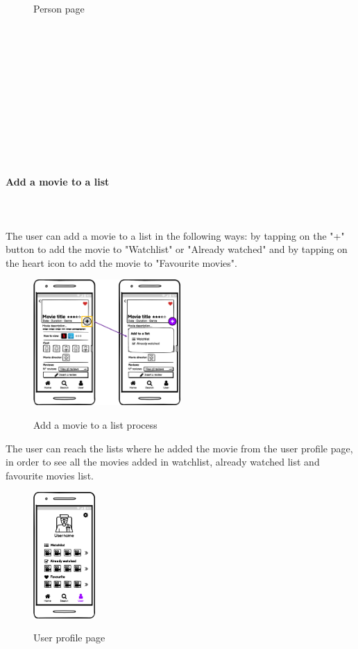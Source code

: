 \documentclass[12pt, a4paper]{article}
\numberwithin{figure}{section}
\begin{document}
\begin{center}
\begin{minipage}{0.4\textwidth}
\begin{figure}[H]
			\caption{Person page}
		\end{figure}
	\end{minipage}	
\end{center}
\mbox{}\\\\\\\\\\\\\\\\\\\\
\paragraph{Add a movie to a list}
\mbox{}\\\\
The user can add a movie to a list in the following ways: by tapping on the "+" button to add the movie to 
"Watchlist" or "Already watched" and by tapping on the heart icon to add the movie to "Favourite movies".
\mbox{}
\begin{figure}[H]
	\centering
	\includegraphics[width=0.5\textwidth]{images/mockups/addMovie.png}\\
	\caption{Add a movie to a list process}
\end{figure}
\noindent
The user can reach the lists where he added the movie from the user profile page,
in order to see all the movies added in watchlist, already watched list and favourite movies list.\\
\begin{figure}[H]
	\centering
	\includegraphics[width=0.21\textwidth]{images/mockups/User profile.png}\\
	\caption{User profile page}
\end{figure}
\end{document}
